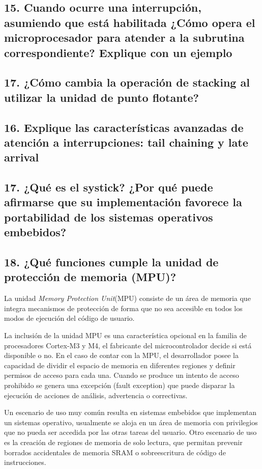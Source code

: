 \documentclass[10pt,a4paper,twoside,spanish]{article}	%
\begin{document}
\subsection*{15. Cuando ocurre una interrupción, asumiendo que está habilitada ¿Cómo opera el microprocesador para atender a la subrutina correspondiente? Explique con un ejemplo}

\subsection*{17. ¿Cómo cambia la operación de stacking al utilizar la unidad de punto flotante?}

\subsection*{16. Explique las características avanzadas de atención a interrupciones: tail chaining y late arrival}

\subsection*{17. ¿Qué es el systick? ¿Por qué puede afirmarse que su implementación favorece la portabilidad de los sistemas operativos embebidos?}

\subsection*{18. ¿Qué funciones cumple la unidad de protección de memoria (MPU)?}

La unidad \textit{Memory Protection Unit}(MPU) consiste de un área de memoria que integra mecanismos de protección de forma que no sea accesible en todos los modos de ejecución del código de usuario. 

La inclusión de la unidad MPU es una característica opcional en la familia de procesadores Cortex-M3 y M4, el fabricante del microcontrolador decide si está disponible o no. En el caso de contar con la MPU, el desarrollador posee la capacidad de dividir el espacio de memoria en diferentes regiones y definir permisos de acceso para cada una. Cuando se produce un intento de acceso prohibido se genera una excepción (fault exception) que puede disparar la ejecución de acciones de análisis, advertencia o correctivas. 

Un escenario de uso muy común resulta en sistemas embebidos que implementan un sistemas operativo, usualmente se aloja en un área de memoria con privilegios que no pueda ser accedida por las otras tareas del usuario. Otro escenario de uso es la creación de regiones de memoria de solo lectura, que permitan prevenir borrados accidentales de memoria SRAM o sobreescritura de código de instrucciones.
\end{document}
